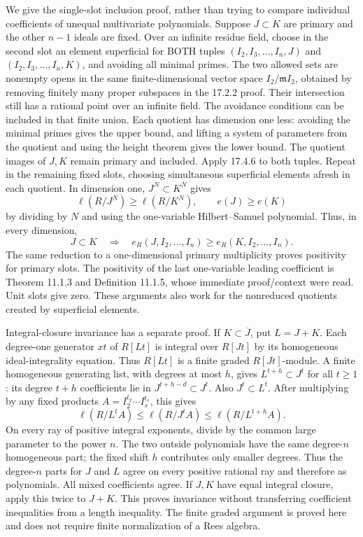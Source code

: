 \documentclass[
  11pt,
]{article}
\begin{document}
We give the single-slot inclusion proof, rather than trying to compare
individual coefficients of unequal multivariate polynomials. Suppose
\(J\subset K\) are primary and the other \(n-1\) ideals are fixed. Over
an infinite residue field, choose in the second slot an element
superficial for BOTH tuples \((I_2,I_3,\ldots,I_n,J)\) and
\((I_2,I_3,\ldots,I_n,K)\), and avoiding all minimal primes. The two
allowed sets are nonempty opens in the same finite-dimensional vector
space \(I_2/\mathfrak m I_2\), obtained by removing finitely many proper
subspaces in the 17.2.2 proof. Their intersection still has a rational
point over an infinite field. The avoidance conditions can be included
in that finite union. Each quotient has dimension one less: avoiding the
minimal primes gives the upper bound, and lifting a system of parameters
from the quotient and using the height theorem gives the lower bound.
The quotient images of \(J,K\) remain primary and included. Apply 17.4.6
to both tuples. Repeat in the remaining fixed slots, choosing
simultaneous superficial elements afresh in each quotient. In dimension
one, \(J^N\subset K^N\) gives
\[\ell(R/J^N)\ge\ell(R/K^N),\qquad e(J)\ge e(K)\] by dividing by \(N\)
and using the one-variable Hilbert--Samuel polynomial. Thus, in every
dimension,
\[J\subset K\quad\Longrightarrow\quad e_R(J,I_2,\ldots,I_n)\ge e_R(K,I_2,\ldots,I_n).\]
The same reduction to a one-dimensional primary multiplicity proves
positivity for primary slots. The positivity of the last one-variable
leading coefficient is Theorem 11.1.3 and Definition 11.1.5, whose
immediate proof/context were read. Unit slots give zero. These arguments
also work for the nonreduced quotients created by superficial elements.

Integral-closure invariance has a separate proof. If
\(K\subset\overline J\), put \(L=J+K\). Each degree-one generator \(xt\)
of \(R[Lt]\) is integral over \(R[Jt]\) by its homogeneous
ideal-integrality equation. Thus \(R[Lt]\) is a finite graded
\(R[Jt]\)-module. A finite homogeneous generating list, with degrees at
most \(h\), gives \(L^{t+h}\subset J^t\) for all \(t\ge1\): its degree
\(t+h\) coefficients lie in \(J^{t+h-d}\subset J^t\). Also
\(J^t\subset L^t\). After multiplying by any fixed products
\(A=I_2^{t_2}\cdots I_s^{t_s}\), this gives
\[\ell(R/L^tA)\le\ell(R/J^tA)\le\ell(R/L^{t+h}A).\] On every ray of
positive integral exponents, divide by the common large parameter to the
power \(n\). The two outside polynomials have the same degree-\(n\)
homogeneous part; the fixed shift \(h\) contributes only smaller
degrees. Thus the degree-\(n\) parts for \(J\) and \(L\) agree on every
positive rational ray and therefore as polynomials. All mixed
coefficients agree. If \(J,K\) have equal integral closure, apply this
twice to \(J+K\). This proves invariance without transferring
coefficient inequalities from a length inequality. The finite graded
argument is proved here and does not require finite normalization of a
Rees algebra.
\end{document}
